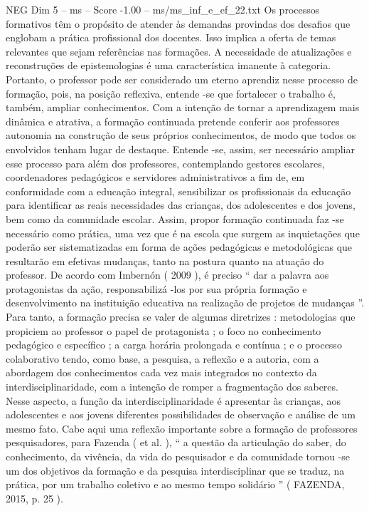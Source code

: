 \begin{textsample}{NEG Dim 5 – ms – Score -1.00 – ms/ms\_inf\_e\_ef\_22.txt}
Os processos formativos têm o propósito de atender às demandas provindas dos desafios que englobam a prática profissional dos docentes.
Isso implica a oferta de temas relevantes que sejam referências nas formações.
A necessidade de atualizações e reconstruções de epistemologias é uma característica imanente à categoria.
Portanto, o professor pode ser considerado um eterno aprendiz nesse processo de formação, pois, na posição reflexiva, entende -se que fortalecer o trabalho é, também, ampliar conhecimentos.
Com a intenção de tornar a aprendizagem mais dinâmica e atrativa, a formação continuada pretende conferir aos professores autonomia na construção de seus próprios conhecimentos, de modo que todos os envolvidos tenham lugar de destaque.
Entende -se, assim, ser necessário ampliar esse processo para além dos professores, contemplando gestores escolares, coordenadores pedagógicos e servidores administrativos a fim de, em conformidade com a educação integral, sensibilizar os profissionais da educação para identificar as reais necessidades das crianças, dos adolescentes e dos jovens, bem como da comunidade escolar.
Assim, propor formação continuada faz -se necessário como prática, uma vez que é na escola que surgem as inquietações que poderão ser sistematizadas em forma de ações pedagógicas e metodológicas que resultarão em efetivas mudanças, tanto na postura quanto na atuação do professor.
De acordo com Imbernón ( 2009 ), é preciso “ dar a palavra aos protagonistas da ação, responsabilizá -los por sua própria formação e desenvolvimento na instituição educativa na realização de projetos de mudanças ”.
Para tanto, a formação precisa se valer de algumas diretrizes : metodologias que propiciem ao professor o papel de protagonista ; o foco no conhecimento pedagógico e específico ; a carga horária prolongada e contínua ; e o processo colaborativo tendo, como base, a pesquisa, a reflexão e a autoria, com a abordagem dos conhecimentos cada vez mais integrados no contexto da interdisciplinaridade, com a intenção de romper a fragmentação dos saberes.
Nesse aspecto, a função da interdisciplinaridade é apresentar às crianças, aos adolescentes e aos jovens diferentes possibilidades de observação e análise de um mesmo fato.
Cabe aqui uma reflexão importante sobre a formação de professores pesquisadores, para Fazenda ( et al. ), “ a questão da articulação do saber, do conhecimento, da vivência, da vida do pesquisador e da comunidade tornou -se um dos objetivos da formação e da pesquisa interdisciplinar que se traduz, na prática, por um trabalho coletivo e ao mesmo tempo solidário ” ( FAZENDA, 2015, p. 25 ).

\end{textsample}
